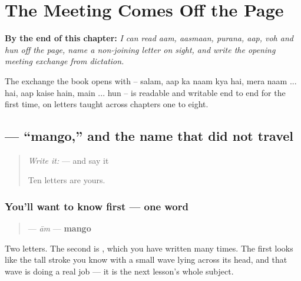 
\chapter{The Meeting Comes Off the Page}
\label{ch:ur-script-meeting}

\begin{chapteropening}
\textbf{By the end of this chapter:} \emph{I can read aam, aasmaan, purana, aap, voh and hun off the page, name a non-joining letter on sight, and write the opening meeting exchange from dictation.}

The exchange the book opens with -- salam, aap ka naam kya hai, mera naam ... hai, aap kaise hain, main ... hun -- is readable and writable end to end for the first time, on letters taught across chapters one to eight.
\end{chapteropening}

\section[\texorpdfstring{\ur{آم} (ām)}{آم (ām)}]{ — \textquotedblleft{}mango,\textquotedblright{} and the name that did not travel}

\label{lesson:UR-C18-aam}



\begin{quote}
\emph{Write it:}    — and say it

Ten letters are yours.
\end{quote}

\subsection*{You'll want to know first — one word}
\begin{quote}
\textbf{} — \emph{ām} — \textbf{mango}
\end{quote}

Two letters. The second is \textbf{}, which you have written many times. The first looks like the tall stroke you know with a small wave lying across its head, and that wave is doing a real job — it is the next lesson's whole subject.

